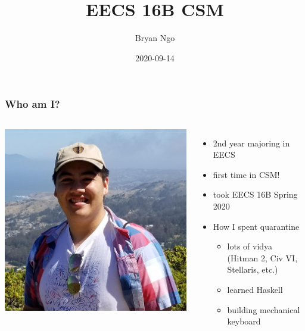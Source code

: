 \documentclass[aspectratio=169]{beamer}
\title{EECS 16B CSM}
\author{Bryan Ngo}
\date{2020-09-14}
\institute{Computer Science Mentors}
\begin{document}
\begin{frame}
    \maketitle
\end{frame}

\begin{frame}
    \frametitle{Who am I?}

    \begin{columns}
        \includegraphics[width=0.8\textheight]{bryan_ngo.png}

        \begin{itemize}
            \item 2nd year majoring in EECS
            \item first time in CSM!
            \item took EECS 16B Spring 2020
            \item How I spent quarantine
            \begin{itemize}
                \item lots of vidya (Hitman 2, Civ VI, Stellaris, etc.)
                \item learned Haskell
                \item building mechanical keyboard
            \end{itemize}
        \end{itemize}
    \end{columns}
\end{frame}
\end{document}
